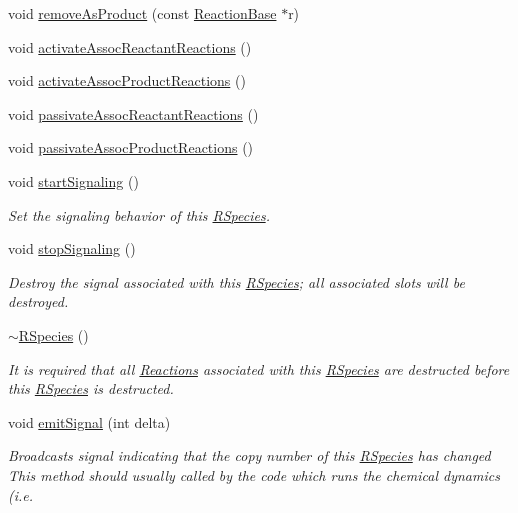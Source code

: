 \begin{DoxyCompactItemize}
void \hyperlink{classchem_1_1RSpecies_a951496132075bd03ba51ba4d753f0d7f}{remove\-As\-Product} (const \hyperlink{classchem_1_1ReactionBase}{Reaction\-Base} $\ast$r)
\item 
void \hyperlink{classchem_1_1RSpecies_a1589cd0e045a084a32dff4a02612d4a3}{activate\-Assoc\-Reactant\-Reactions} ()
\item 
void \hyperlink{classchem_1_1RSpecies_ab275b0c9fb9352abe35a3bd68f3917fb}{activate\-Assoc\-Product\-Reactions} ()
\item 
void \hyperlink{classchem_1_1RSpecies_a0c33c29f86ee16b84151bc5f38953076}{passivate\-Assoc\-Reactant\-Reactions} ()
\item 
void \hyperlink{classchem_1_1RSpecies_aff8862396958db832848c94135282f1e}{passivate\-Assoc\-Product\-Reactions} ()
\item 
void \hyperlink{classchem_1_1RSpecies_a0beefdc1ec28646df87b0690a2d66734}{start\-Signaling} ()
\begin{DoxyCompactList}\small\item\em Set the signaling behavior of this \hyperlink{classchem_1_1RSpecies}{R\-Species}. \end{DoxyCompactList}\item 
void \hyperlink{classchem_1_1RSpecies_a3519759c28c5d50108753ebe6c67a537}{stop\-Signaling} ()
\begin{DoxyCompactList}\small\item\em Destroy the signal associated with this \hyperlink{classchem_1_1RSpecies}{R\-Species}; all associated slots will be destroyed. \end{DoxyCompactList}\item 
\hyperlink{classchem_1_1RSpecies_a3c875e360f7f53b2ca8bd30f7dbbb7ed}{$\sim$\-R\-Species} ()
\begin{DoxyCompactList}\small\item\em It is required that all \hyperlink{classchem_1_1Reaction}{Reactions} associated with this \hyperlink{classchem_1_1RSpecies}{R\-Species} are destructed before this \hyperlink{classchem_1_1RSpecies}{R\-Species} is destructed. \end{DoxyCompactList}\item 
void \hyperlink{classchem_1_1RSpecies_afaee31bbc312ca6fa84a9ffc02457611}{emit\-Signal} (int delta)
\begin{DoxyCompactList}\small\item\em Broadcasts signal indicating that the copy number of this \hyperlink{classchem_1_1RSpecies}{R\-Species} has changed This method should usually called by the code which runs the chemical dynamics (i.\-e. \end{DoxyCompactList}\item 

\end{DoxyCompactItemize}
